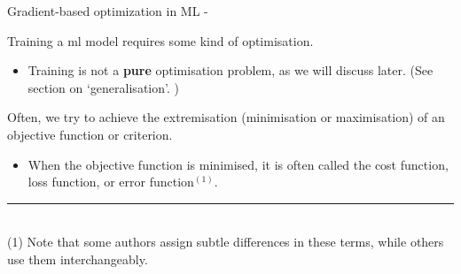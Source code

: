 

\begin{frame}[t,allowframebreaks]{
    Gradient-based optimization in ML -}

    Training a \gls{ml} model requires 
    some kind of \gls{optimisation}.
    \begin{itemize}
        \item Training is not a {\bf pure} \gls{optimisation} problem, 
        as we will discuss later. (See section on `\Gls{generalisation}'. 
        \hyperlink{sec:Generalisation}{})
    \end{itemize}
    \vspace{0.2cm}

    Often, we try to achieve the \gls{extremisation} 
    (minimisation or maximisation) of an 
    \gls{objective function} or 
    \gls{criterion}.
    \begin{itemize}
        \item 
            When the \gls{objective function} is minimised, 
            it is often called the
            \gls{cost function},
            \gls{loss function}, or
            \gls{error function}$^{(1)}$.
    \end{itemize}
    \vspace{0.2cm}

    \vspace{0.1cm}
    \noindent\rule{4cm}{0.4pt}\\
    {\tiny
    (1) Note that some authors assign subtle differences in these terms,
    while others use them interchangeably.\\
    }

    \framebreak



\end{frame}
